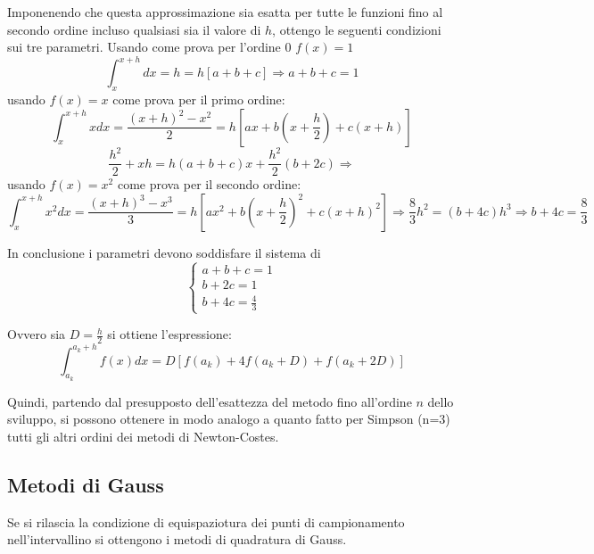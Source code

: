 \documentclass{article}
\begin{document}
Imponenendo che questa approssimazione sia esatta per tutte le funzioni fino al secondo ordine incluso qualsiasi sia il valore di $h$, ottengo le seguenti condizioni sui tre parametri.
\newline
Usando come prova per l'ordine 0 $f(x)=1$
	\begin{displaymath}
	\int_{x}^{x+h}dx=h=h[a+b+c]\Longrightarrow a+b+c=1
	\end{displaymath}
usando $f(x)=x$ come prova per il primo ordine: 
	\begin{displaymath}
	\int_{x}^{x+h}xdx=\dfrac{(x+h)^{2}-x^{2}}{2}=h[ax+b(x+\frac{h}{2})+c(x+h)]
	\end{displaymath}
	\begin{displaymath}
	\frac{h^{2}}{2}+xh= h(a+b+c)x+\frac{h^{2}}{2}(b+2c)\Longrightarrow
	\end{displaymath}
usando $f(x)=x^{2}$ come prova per il secondo ordine: 
	\begin{displaymath}
	\int_{x}^{x+h}x^{2}dx=\dfrac{(x+h)^{3}-x^{3}}{3}=h[ax^{2}+b(x+\frac{h}{2})^{2}+c(x+h)^{2}] \Longrightarrow \frac{8}{3}h^{2}=(b+4c)h^{3}\Rightarrow b+4c = \frac{8}{3}
	\end{displaymath}

In conclusione i parametri devono soddisfare il sistema di 
	\begin{displaymath}
		\left\{
			\begin{array}{l}
			a+b+c=1 \\
			b+2c=1 \\
			b+4c=\frac{4}{3}
 			\end{array} 
		\right.
	\end{displaymath}

Ovvero sia $D= \frac{h}{2}$ si ottiene l'espressione:
	\begin{equation}
	\int_{a_{k}}^{a_{k}+h}f(x)dx= D[f(a_{k})+4f(a_{k}+D)+f(a_{k}+2D)]
	\end{equation}

Quindi, partendo dal presupposto dell'esattezza del metodo fino all'ordine $n$ dello sviluppo, si possono ottenere in modo analogo a quanto fatto per Simpson (n=3) tutti gli altri ordini dei metodi di Newton-Costes.

\subsection{Metodi di Gauss}

Se si rilascia la condizione di equispaziotura dei punti di campionamento nell'intervallino si ottengono i metodi di quadratura di Gauss.
\end{document}

